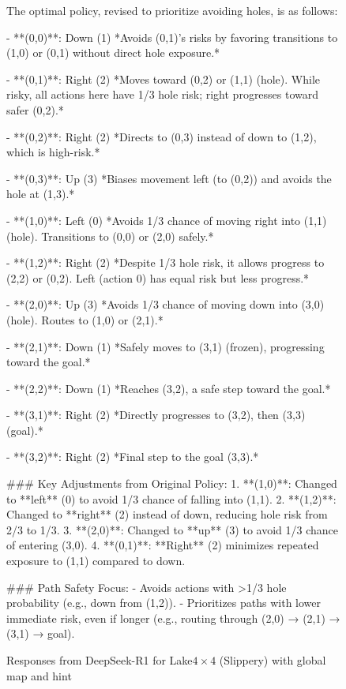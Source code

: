 \documentclass{article}
\begin{document}
\begin{figure}
\begin{mdframed}[roundcorner=10pt]
The optimal policy, revised to prioritize avoiding holes, is as follows:

- **(0,0)**: Down (1)  
  *Avoids (0,1)'s risks by favoring transitions to (1,0) or (0,1) without direct hole exposure.*

- **(0,1)**: Right (2)  
  *Moves toward (0,2) or (1,1) (hole). While risky, all actions here have 1/3 hole risk; right progresses toward safer (0,2).*

- **(0,2)**: Right (2)  
  *Directs to (0,3) instead of down to (1,2), which is high-risk.*

- **(0,3)**: Up (3)  
  *Biases movement left (to (0,2)) and avoids the hole at (1,3).*

- **(1,0)**: Left (0)  
  *Avoids 1/3 chance of moving right into (1,1) (hole). Transitions to (0,0) or (2,0) safely.*

- **(1,2)**: Right (2)  
  *Despite 1/3 hole risk, it allows progress to (2,2) or (0,2). Left (action 0) has equal risk but less progress.*

- **(2,0)**: Up (3)  
  *Avoids 1/3 chance of moving down into (3,0) (hole). Routes to (1,0) or (2,1).*

- **(2,1)**: Down (1)  
  *Safely moves to (3,1) (frozen), progressing toward the goal.*

- **(2,2)**: Down (1)  
  *Reaches (3,2), a safe step toward the goal.*

- **(3,1)**: Right (2)  
  *Directly progresses to (3,2), then (3,3) (goal).*

- **(3,2)**: Right (2)  
  *Final step to the goal (3,3).*

\#\#\# Key Adjustments from Original Policy:
1. **(1,0)**: Changed to **left** (0) to avoid 1/3 chance of falling into (1,1).
2. **(1,2)**: Changed to **right** (2) instead of down, reducing hole risk from 2/3 to 1/3.
3. **(2,0)**: Changed to **up** (3) to avoid 1/3 chance of entering (3,0).
4. **(0,1)**: **Right** (2) minimizes repeated exposure to (1,1) compared to down.

\#\#\# Path Safety Focus:
- Avoids actions with >1/3 hole probability (e.g., down from (1,2)).
- Prioritizes paths with lower immediate risk, even if longer (e.g., routing through (2,0) → (2,1) → (3,1) → goal).
\end{mdframed}
\caption{Responses from DeepSeek-R1 for Lake$4\times4$ (Slippery) with global map and hint}
\label{page:results_ds_wo_hint}
\end{figure}
\end{document}

